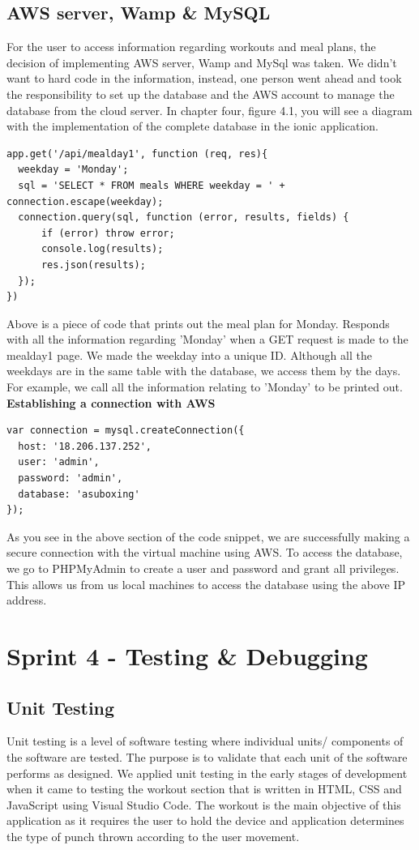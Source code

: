 \documentclass[a4paper,12pt]{report}
\begin{document}
\subsection{AWS server, Wamp \& MySQL}
For the user to access information regarding workouts and meal plans, the decision of implementing AWS server, Wamp and MySql was taken. We didn't want to hard code in the information, instead, one person went ahead and took the responsibility to set up the database and the AWS account to manage the database from the cloud server. In chapter four, figure 4.1, you will see a diagram with the implementation of the complete database in the ionic application.
\newpage
\begin{verbatim}
app.get('/api/mealday1', function (req, res){
  weekday = 'Monday';
  sql = 'SELECT * FROM meals WHERE weekday = ' + connection.escape(weekday);
  connection.query(sql, function (error, results, fields) {
      if (error) throw error;
      console.log(results);
      res.json(results);
  });
})
\end{verbatim}
Above is a piece of code that prints out the meal plan for Monday.
Responds with all the information regarding 'Monday' when a GET request is made to the mealday1 page. We made the weekday into a unique ID. Although all the weekdays are in the same table with the database, we access them by the days. For example, we call all the information relating to 'Monday' to be printed out.
\\
\textbf{Establishing a connection with AWS}
\begin{verbatim}
var connection = mysql.createConnection({
  host: '18.206.137.252',
  user: 'admin',
  password: 'admin',
  database: 'asuboxing'
});
\end{verbatim}
As you see in the above section of the code snippet, we are successfully making a secure connection with the virtual machine using AWS. To access the database, we go to PHPMyAdmin to create a user and password and grant all privileges. This allows us from us local machines to access the database using the above IP address. 

\section{Sprint 4 - Testing \& Debugging}
\subsection{Unit Testing}
Unit testing is a level of software testing where individual units/ components of the software are tested. The purpose is to validate that each unit of the software performs as designed.\cite{unitTesting}
We applied unit testing in the early stages of development when it came to testing the workout section that is written in HTML, CSS and JavaScript using Visual Studio Code. The workout is the main objective of this application as it requires the user to hold the device and application determines the type of punch thrown according to the user movement.
\end{document}
